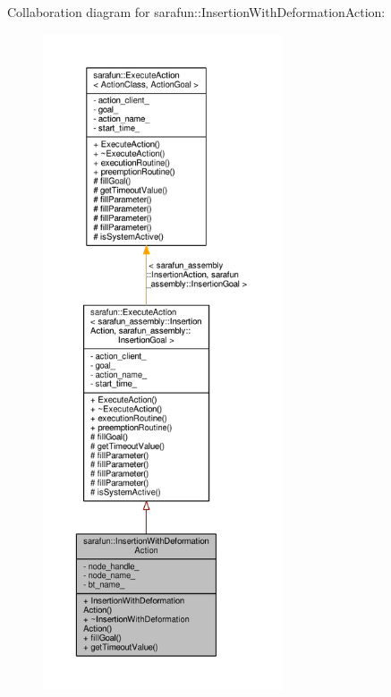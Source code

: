 Collaboration diagram for sarafun\-:\-:Insertion\-With\-Deformation\-Action\-:\nopagebreak
\begin{figure}[H]
\begin{center}
\leavevmode
\includegraphics[height=550pt]{da/dd6/classsarafun_1_1InsertionWithDeformationAction__coll__graph}
\end{center}
\end{figure}

